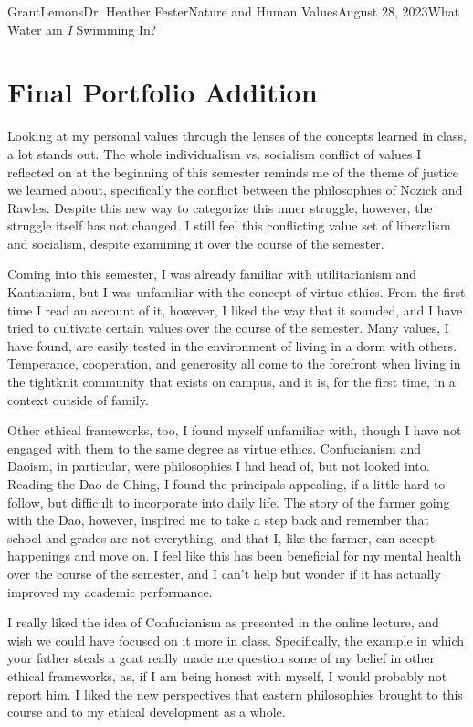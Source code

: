 \documentclass[12pt,letterpaper]{article}
\begin{document}
\begin{mla}{Grant}{Lemons}{Dr. Heather Fester}{Nature and Human Values}{August 28, 2023}{What Water am \textit{I} Swimming In?}
    \section{Final Portfolio Addition}
        Looking at my personal values through the lenses of the concepts learned in class, a lot stands out.
        The whole individualism vs. socialism conflict of values I reflected on at the beginning of this semester reminds me of the theme of justice we learned about, specifically the conflict between the philosophies
        of Nozick and Rawles.
        Despite this new way to categorize this inner struggle, however, the struggle itself has not changed.
        I still feel this conflicting value set of liberalism and socialism, despite examining it over the course of the semester.

        Coming into this semester, I was already familiar with utilitarianism and Kantianism, but I was unfamiliar with the concept of virtue ethics.
        From the first time I read an account of it, however, I liked the way that it sounded, and I have tried to cultivate certain values over the course of the semester.
        Many values, I have found, are easily tested in the environment of living in a dorm with others.
        Temperance, cooperation, and generosity all come to the forefront when living in the tightknit community that exists on campus, and it is, for the first time, in a context outside of family.

        Other ethical frameworks, too, I found myself unfamiliar with, though I have not engaged with them to the same degree as virtue ethics.
        Confucianism and Daoism, in particular, were philosophies I had head of, but not looked into.
        Reading the Dao de Ching, I found the principals appealing, if a little hard to follow, but difficult to incorporate into daily life.
        The story of the farmer going with the Dao, however, inspired me to take a step back and remember that school and grades are not everything, and that I, like the farmer, can accept happenings and move on.
        I feel like this has been beneficial for my mental health over the course of the semester, and I can't help but wonder if it has actually improved my academic performance.

        I really liked the idea of Confucianism as presented in the online lecture, and wish we could have focused on it more in class.
        Specifically, the example in which your father steals a goat really made me question some of my belief in other ethical frameworks, as, if I am being honest with myself, I would probably not report him.
        I liked the new perspectives that eastern philosophies brought to this course and to my ethical development as a whole.

    \printbibliography
\end{mla}
\end{document}
